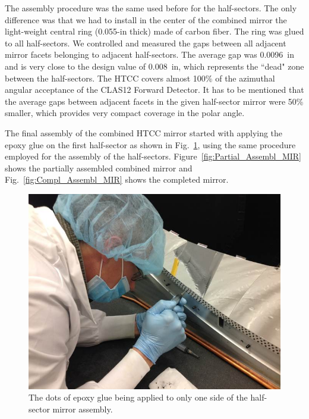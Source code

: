 The assembly procedure was the same used before for the half-sectors. The only difference was that we had to
install in the center of the combined mirror the light-weight central ring (0.055-in thick) made of carbon fiber.
The ring was glued to all half-sectors. We controlled and measured the gaps between all adjacent mirror facets
belonging to adjacent half-sectors. The average gap was 0.0096~in and is very close to the design value of
0.008~in, which represents the ``dead" zone between the half-sectors. The HTCC covers almost 100\% of the
azimuthal angular acceptance of the CLAS12 Forward Detector. It has to be mentioned that the average gaps
between adjacent facets in the given half-sector mirror were 50\% smaller, which provides very compact coverage
in the polar angle. 

The final assembly of the combined HTCC mirror started with applying the epoxy glue on the first half-sector as
shown in Fig.~\ref{fig:Ap_Gl_Half_Sect}, using the same procedure employed for the assembly of the
half-sectors. Figure~\ref{fig:Partial_Assembl_MIR} shows the partially assembled combined mirror and 
Fig.~\ref{fig:Compl_Assembl_MIR} shows the completed mirror. 
 
\begin{figure}[ht]
    \centering
    \includegraphics[width=1.0\linewidth]{images/Ap_Gl_Half_Sect.jpg}
    \caption{The dots of epoxy glue being applied to only one side of the half-sector mirror assembly.}
    \label{fig:Ap_Gl_Half_Sect}
\end{figure}
 
